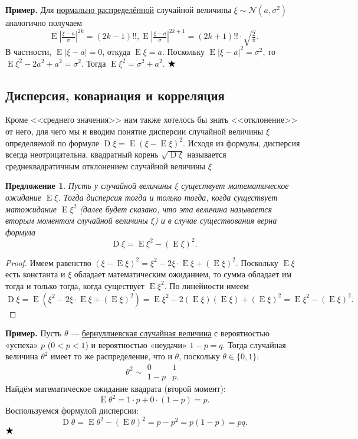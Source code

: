 \documentclass[12pt]{article}
\newtheorem{proposition}[theorem]{Предложение}
\numberwithin{theorem}{section}
\theoremstyle{definition}
\newenvironment{example}{\indent \textbf{Пример.}}{$ \hfill \bigstar $}
\newcommand{\defin}[2]{\hypertarget{#2}{{\color{red} #1}}}
\newcommand{\expect}{\operatorname{E}}
\newcommand{\disp}{\operatorname{D}}
\begin{document}
	\begin{example}
		Для \hyperlink{normal-distribution}{нормально распределённой} 
		случайной величины $ \xi \sim \mathcal{N}(a, \sigma^2) $
		аналогично получаем
		$$ \expect|\tfrac{\xi - a}{\sigma}|^{2k} = (2k - 1)!!, 
		\expect|\tfrac{\xi - a}{\sigma}|^{2k + 1} = (2k + 1)!! \cdot \sqrt{\tfrac{2}{\pi}}. $$
		В частности, $ \expect|\xi - a| = 0 $, откуда $ \expect\xi = a $.
		Поскольку $ \expect|\xi - a|^2 = \sigma^2 $,
		то $ \expect\xi^2 - 2a^2 + a^2 = \sigma^2 $.
		Тогда $ \expect\xi^2 = \sigma^2 + a^2 $.
	\end{example}
	
	\subsection{Дисперсия, ковариация и корреляция}
	
	Кроме <<среднего значения>> нам также хотелось бы знать <<отклонение>> от него,
	для чего мы и вводим понятие \defin{дисперсии случайной величины $ \xi $},
	определяемой по формуле $ \disp\xi = \expect(\xi - \expect\xi)^2 $.
	Исходя из формулы, дисперсия всегда неотрицательна,
	квадратный корень $ \sqrt{\disp\xi} $ называется
	\defin{среднеквадратичным отклонением случайной величины $ \xi $}.
	
	\begin{proposition}
		Пусть у случайной величины $ \xi $ существует математическое ожидание $ \expect\xi $.
		Тогда дисперсия тогда и только тогда, когда существует матожидание 
		$ \expect\xi^2 $ (далее будет сказано, что эта величина называется вторым моментом случайной величины $ \xi $)
		и в случае существования верна формула
		$$ \disp\xi = \expect\xi^2 - (\expect\xi)^2. $$
	\end{proposition}
	
	\begin{proof}
		Имеем равенство $ (\xi - \expect\xi)^2 = \xi^2 - 2\xi \cdot \expect \xi + (\expect\xi)^2 $.
		Поскольку $ \expect\xi $ есть константа и $ \xi $ обладает математическим ожиданием,
		то сумма обладает им тогда и только тогда, когда существует $ \expect\xi^2 $.
		По линейности имеем
		$$ \disp\xi = \expect(\xi^2 - 2\xi \cdot \expect \xi + (\expect\xi)^2)
		= \expect\xi^2 - 2(\expect\xi)(\expect\xi) + (\expect\xi)^2 = \expect\xi^2 - (\expect\xi)^2. $$
	\end{proof}
	
	\begin{example}
		Пусть $\theta$ — \hyperlink{Bernoulli-distribution}{бернуллиевская случайная величина} с вероятностью «успеха» $p$ ($0 < p < 1$) и вероятностью «неудачи» $1 - p = q$.  
		Тогда случайная величина $\theta^2$ имеет то же распределение, что и $\theta$, поскольку $\theta \in \{0,1\}$:
		\[
		\theta^2 \sim
		\begin{array}{cc}
			0 & 1 \\
			1 - p & p.
		\end{array}
		\]
		Найдём математическое ожидание квадрата (второй момент):
		\[
		\expect\theta^2 = 1 \cdot p + 0 \cdot (1 - p) = p.
		\]
		Воспользуемся формулой дисперсии:
		\[
		\disp\theta = \expect\theta^2 - (\expect\theta)^2 = p - p^2 = p(1 - p) = pq.
		\]
	\end{example}
	
\end{document}
